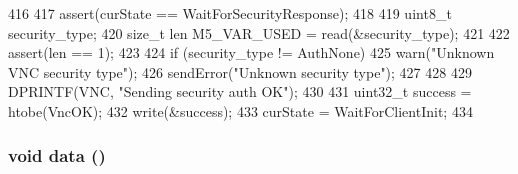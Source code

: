 \begin{DoxyCode}
416 {
417     assert(curState == WaitForSecurityResponse);
418 
419     uint8_t security_type;
420     size_t len M5_VAR_USED = read(&security_type);
421 
422     assert(len == 1);
423 
424     if (security_type != AuthNone) {
425         warn("Unknown VNC security type\n");
426         sendError("Unknown security type\n");
427     }
428 
429     DPRINTF(VNC, "Sending security auth OK\n");
430 
431     uint32_t success = htobe(VncOK);
432     write(&success);
433     curState = WaitForClientInit;
434 }
\end{DoxyCode}
\hypertarget{classVncServer_a6617ba3e856d8b24979a2a44e5417172}{
\subsubsection[{data}]{\setlength{\rightskip}{0pt plus 5cm}void data ()}}
\label{classVncServer_a6617ba3e856d8b24979a2a44e5417172}



